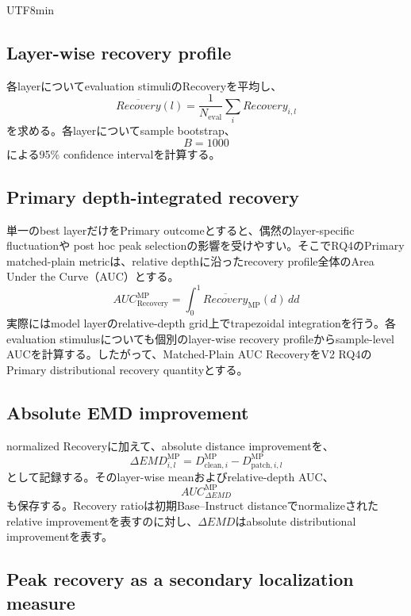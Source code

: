 \documentclass{article} %
\begin{document}
\begin{CJK*}{UTF8}{min}
\subsection{Layer-wise recovery profile}

各layerについてevaluation stimuliのRecoveryを平均し、
\[
\overline{Recovery}(l)
=
\frac{1}{N_{\mathrm{eval}}}
\sum_i
Recovery_{i,l}
\]
を求める。各layerについてsample bootstrap、
\[
B=1000
\]
による95\% confidence intervalを計算する。


\subsection{Primary depth-integrated recovery}

単一のbest layerだけをPrimary outcomeとすると、偶然のlayer-specific fluctuationや
post hoc peak selectionの影響を受けやすい。そこでRQ4のPrimary matched-plain metricは、relative depthに沿ったrecovery profile全体のArea Under the Curve（AUC）とする。
\[
AUC_{\mathrm{Recovery}}^{\mathrm{MP}}
=
\int_0^1
\overline{Recovery}_{\mathrm{MP}}(d)\,dd
\]
実際にはmodel layerのrelative-depth grid上でtrapezoidal integrationを行う。各evaluation stimulusについても個別のlayer-wise recovery profileからsample-level AUCを計算する。したがって、Matched-Plain AUC RecoveryをV2 RQ4のPrimary distributional recovery quantityとする。


\subsection{Absolute EMD improvement}

normalized Recoveryに加えて、absolute distance improvementを、
\[
\Delta EMD_{i,l}^{\mathrm{MP}}
=
D_{\mathrm{clean},i}^{\mathrm{MP}}
-
D_{\mathrm{patch},i,l}^{\mathrm{MP}}
\]
として記録する。そのlayer-wise meanおよびrelative-depth AUC、
\[
AUC_{\Delta EMD}^{\mathrm{MP}}
\]
も保存する。Recovery ratioは初期Base--Instruct distanceでnormalizeされたrelative improvementを表すのに対し、\(\Delta EMD\)はabsolute distributional improvementを表す。


\subsection{Peak recovery as a secondary localization measure}


\end{CJK*}
\end{document}

